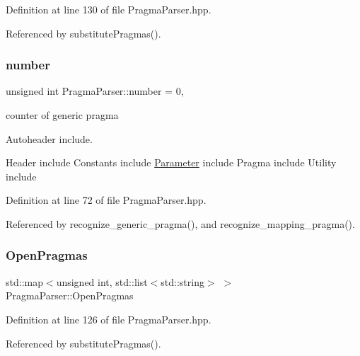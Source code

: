Definition at line 130 of file Pragma\+Parser.\+hpp.



Referenced by substitute\+Pragmas().

\mbox{\label{classPragmaParser_a9a81b9f19ab3820b1b19adc4e73b2919}} 
\subsubsection{\texorpdfstring{number}{number}}
{\footnotesize\ttfamily unsigned int Pragma\+Parser\+::number = 0\hspace{0.3cm}{\ttfamily [static]}, {\ttfamily [private]}}



counter of generic pragma 

Autoheader include.

Header include Constants include \hyperlink{classParameter}{Parameter} include Pragma include Utility include 

Definition at line 72 of file Pragma\+Parser.\+hpp.



Referenced by recognize\+\_\+generic\+\_\+pragma(), and recognize\+\_\+mapping\+\_\+pragma().

\mbox{\label{classPragmaParser_a9fab2866a8697ebec477bda192a1ce85}} 
\subsubsection{\texorpdfstring{Open\+Pragmas}{OpenPragmas}}
{\footnotesize\ttfamily std\+::map$<$unsigned int, std\+::list$<$std\+::string$>$ $>$ Pragma\+Parser\+::\+Open\+Pragmas\hspace{0.3cm}{\ttfamily [private]}}



Definition at line 126 of file Pragma\+Parser.\+hpp.



Referenced by substitute\+Pragmas().

\mbox{\label{classPragmaParser_a29c814a59a2860e1cd13ec5c5847ad0e}} 
